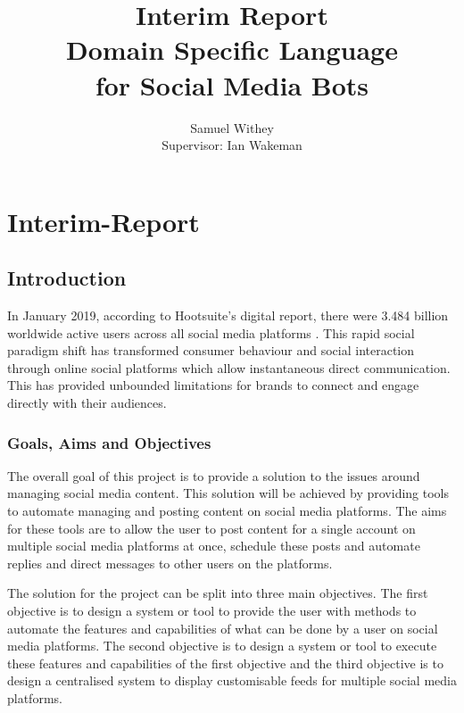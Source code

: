 \documentclass[chapterprefix=false]{scrreprt}
\title{Interim Report \\
  Domain Specific Language \\
  for Social Media Bots}
\author{Samuel Withey \\
	Supervisor: Ian Wakeman}
\date{}
\begin{document}
\maketitle

\newpage

\tableofcontents

\newpage

\renewcommand{\chaptername}{} 

\chapter{Interim-Report}

\section{Introduction}

In January 2019, according to Hootsuite's digital report, there were 3.484 billion worldwide active users across all social media platforms \cite{global-digital-report-2019}. This rapid social paradigm shift has transformed consumer behaviour and social interaction through online social platforms which allow instantaneous direct communication. This has provided unbounded limitations for brands to connect and engage directly with their audiences.

\subsection{Goals, Aims and Objectives}

The overall goal of this project is to provide a solution to the issues around managing social media content. This solution will be achieved by providing tools to automate managing and posting content on social media platforms. The aims for these tools are to allow the user to post content for a single account on multiple social media platforms at once, schedule these posts and automate replies and direct messages to other users on the platforms.

The solution for the project can be split into three main objectives. The first objective is to design a system or tool to provide the user with methods to automate the features and capabilities of what can be done by a user on social media platforms. The second objective is to design a system or tool to execute these features and capabilities of the first objective and the third objective is to design a centralised system to display customisable feeds for multiple social media platforms.
\end{document}
